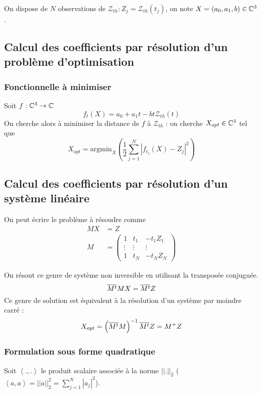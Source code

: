 On dispose de $N$ observations de $\mathcal Z_{th} : Z_j = \mathcal Z_{th}(t_j)$, on note $X = (a_0,a_1,b) \in \mathbb C^3$.
\subsection{Calcul des coefficients par résolution d'un problème d'optimisation}
\subsubsection{Fonctionnelle à minimiser}
Soit $f:\mathbb C^3 \rightarrow \mathbb C$
\[
f_t(X) = a_0 + a_1 t - b t \mathcal Z_{th}(t)
\]
On cherche alors à minimiser la distance de $f$ à $\mathcal Z_{th}$  : on cherche $X_{opt}\in \mathbb C^3$ tel que
\[
X_{opt} = \text{argmin}_X \left( \frac{1}{2}\sum_{j=1}^{N} | f_{t_j}(X) - Z_j|^2 \right)
\]

\subsection{Calcul des coefficients par résolution d'un système linéaire}
On peut écrire le problème à résoudre comme
\begin{align*}
	MX &= Z\\
	M &=
	\begin{pmatrix}
		1 & t_1 & -t_1Z_1 \\
		\vdots & \vdots & \vdots \\
		1 & t_N & -t_NZ_N
	\end{pmatrix}
\end{align*}

On résout ce genre de système non inversible en utilisant la transposée conjuguée. 
\begin{equation}
   {\overline{M^t}}MX = {\overline{M^t}} Z
\end{equation}
Ce genre de solution est équivalent à la résolution d'un système par moindre carré \cite{penrose_best_1956} :
\begin{equation}
  X_{opt} = \left({\overline{M^t}}M\right)^{-1}{\overline{M^t}} Z = M^+ Z
\end{equation}

\subsubsection{Formulation sous forme quadratique}\label{sec_formQ}

Soit $\left<.,.\right>$ le produit scalaire associée à la norme $||.||_2$ ($\left<a,a\right> = ||a||_2^2 = \sum_{j=1}^N|a_j|^2$).


